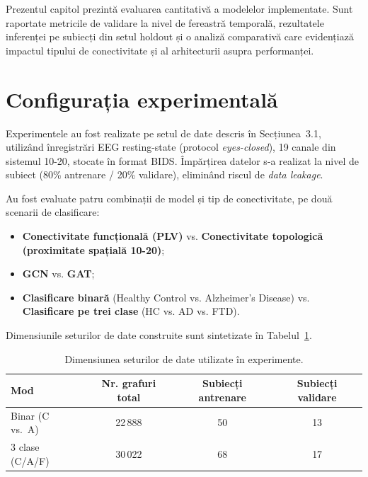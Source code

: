 \documentclass[12pt,a4paper]{report}
\theoremstyle{definition}
\theoremstyle{remark}
\begin{document}
Prezentul capitol prezintă evaluarea cantitativă a modelelor implementate. Sunt raportate
metricile de validare la nivel de fereastră temporală, rezultatele inferenței pe subiecți
din setul holdout și o analiză comparativă care evidențiază impactul tipului de
conectivitate și al arhitecturii asupra performanței.

\section{Configurația experimentală}
\label{sec:config_exp}

Experimentele au fost realizate pe setul de date descris în Secțiunea~3.1, utilizând
înregistrări EEG resting-state (protocol \textit{eyes-closed}), 19 canale din sistemul
10-20, stocate în format BIDS. Împărțirea datelor s-a realizat la nivel de subiect
(80\% antrenare / 20\% validare), eliminând riscul de \textit{data leakage}.

Au fost evaluate patru combinații de model și tip de conectivitate, pe două scenarii
de clasificare:

\begin{itemize}
    \item \textbf{Conectivitate funcțională (PLV)} vs. \textbf{Conectivitate topologică
          (proximitate spațială 10-20)};
    \item \textbf{GCN} vs. \textbf{GAT};
    \item \textbf{Clasificare binară} (Healthy Control vs. Alzheimer's Disease) vs.
          \textbf{Clasificare pe trei clase} (HC vs. AD vs. FTD).
\end{itemize}

Dimensiunile seturilor de date construite sunt sintetizate în Tabelul~\ref{tab:dataset_size}.

\begin{table}[H]
    \centering
    \caption{Dimensiunea seturilor de date utilizate în experimente.}
    \label{tab:dataset_size}
    \begin{tabular}{|l|c|c|c|}
        \hline
        \textbf{Mod} & \textbf{Nr. grafuri total} & \textbf{Subiecți antrenare} & \textbf{Subiecți validare} \\
        \hline
        Binar (C vs.\ A) & 22\,888 & 50 & 13 \\
        \hline
        3 clase (C/A/F) & 30\,022 & 68 & 17 \\
        \hline
    \end{tabular}
\end{table}
\end{document}
